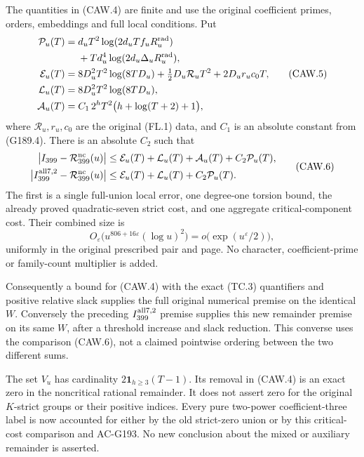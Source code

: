 \begin{theorem}
\label{AC-G192-window}
The quantities in (CAW.4) are finite and use the original
coefficient primes, orders, embeddings and full local conditions.
Put
\[
 \begin{split}
 \mathcal P_u(T)={}&d_uT^2\log(2d_uTf_uR_u^{\rm rad})\\
 &+Td_u^4\log(2d_u\Delta_uR_u^{\rm rad}),\\
 \mathcal E_u(T)={}&8D_u^2T^2\log(8TD_u)
       +\tfrac12D_u\mathcal R_uT^2+2D_ur_uc_0T,\\
 \mathcal L_u(T)={}&8D_u^2T^2\log(8TD_u),\\
 \mathcal A_u(T)={}&C_1\,2^hT^2\bigl(h+\log(T+2)+1\bigr),
 \end{split}\tag{CAW.5}
\]
where $\mathcal R_u,r_u,c_0$ are the original (FL.1) data,
and $C_1$ is an absolute constant from (G189.4).
There is an absolute $C_2$ such that
\[
 \begin{aligned}
 \bigl|I_{399}-\mathcal R_{399}^{\rm nc}(u)\bigr|
   &\leq \mathcal E_u(T)+\mathcal L_u(T)
                   +\mathcal A_u(T)+C_2\mathcal P_u(T),\\
 \bigl|I_{399}^{\rm all7,2}-\mathcal R_{399}^{\rm nc}(u)\bigr|
   &\leq \mathcal E_u(T)+\mathcal L_u(T)+C_2\mathcal P_u(T).
 \end{aligned}\tag{CAW.6}
\]
The first is a single full-union local error, one degree-one
torsion bound, the already proved quadratic-seven strict cost,
and one aggregate critical-component cost.
Their combined size is
\[
 O_\varepsilon\bigl(u^{806+16\varepsilon}(\log u)^2\bigr)
                 =o\bigl(\exp(u^\varepsilon/2)\bigr),
 \tag{CAW.7}
\]
uniformly in the original prescribed pair and page.
No character, coefficient-prime or family-count multiplier is added.

Consequently a bound for (CAW.4) with the exact (TC.3) quantifiers
and positive relative slack supplies the full original numerical
premise on the identical $W$.  Conversely the preceding
$I_{399}^{\rm all7,2}$ premise supplies this new remainder premise
on its same $W$, after a threshold increase and slack reduction.
This converse uses the comparison (CAW.6), not a claimed pointwise
ordering between the two different sums.

The set $V_u$ has cardinality
$2\mathbf1_{h\geq3}(T-1)$.  Its removal in (CAW.4) is an exact
zero in the noncritical rational remainder.  It does not assert
zero for the original $K$-strict groups or their positive indices.
Every pure two-power coefficient-three label is now accounted for
either by the old strict-zero union or by this critical-cost
comparison and AC-G193.  No new conclusion about the mixed or
auxiliary remainder is asserted.
\end{theorem}

